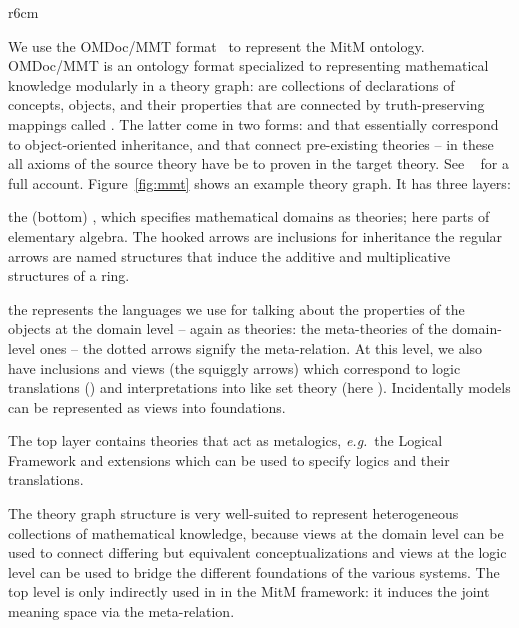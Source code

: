 \begin{wrapfigure}r{6cm}\centering\vspace*{-2em}
  \vspace*{-.5em}
  \caption{OMDoc/MMT Theory Graphs}\label{fig:mmt}\vspace*{-1em}
\end{wrapfigure}
We use the OMDoc/MMT format~\cite{Kohlhase:OMDoc1.2,MMTSVN:on} to represent the MitM
ontology. OMDoc/MMT is an ontology format specialized to representing mathematical
knowledge modularly in a theory graph:  are collections of declarations
of concepts, objects, and their properties that are connected by truth-preserving mappings
called . The latter come in two forms:  and
 that essentially correspond to object-oriented inheritance, and
 that connect pre-existing theories -- in these all axioms of the source
theory have be to proven in the target theory. See ~\cite{RabKoh:WSMSML13} for a full
account. Figure~\ref{fig:mmt} shows an example theory graph. It has three layers:
\begin{compactenum}[\em i\rm)]
\item the (bottom) , which specifies mathematical domains as theories; here
  parts of elementary algebra. The hooked arrows are inclusions for inheritance the
  regular arrows are named structures that induce the additive and multiplicative
  structures of a ring.
\item the  represents the languages we use for talking about the
  properties of the objects at the domain level -- again as theories: the meta-theories of
  the domain-level ones -- the dotted arrows signify the meta-relation. At this level, we
  also have inclusions and views (the squiggly arrows) which correspond to logic
  translations () and interpretations into  like
  set theory (here ). Incidentally models can be represented as views into
  foundations.
\item The top layer contains theories that act as metalogics, \emph{e.g.}\ the Logical Framework
   and extensions which can be used to specify logics and their translations.
\end{compactenum}
The theory graph structure is very well-suited to represent heterogeneous collections of
mathematical knowledge, because views at the domain level can be used to connect differing
but equivalent conceptualizations and views at the logic level can be used to bridge the
different foundations of the various systems. The top level is only indirectly used in in
the MitM framework: it induces the joint meaning space via the meta-relation.

